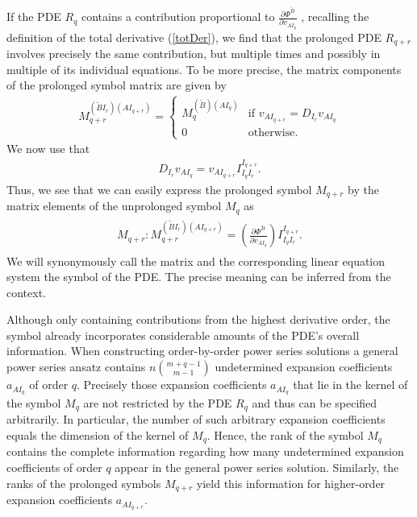 If the PDE $R_q$ contains a contribution proportional to $\frac{\partial \Phi^{\tilde{B}}}{\partial v_{AI_q}}$ , recalling the definition of the total derivative (\ref{totDer}), we find that the prolonged PDE $R_{q+r}$ involves precisely the same contribution, but multiple times and possibly in multiple of its individual equations. 
To be more precise, the matrix components of the prolonged symbol matrix are given by
\begin{align}
M_{q+r}^{(\tilde{B}I_r) (AI_{q+r})} = 
\begin{cases}
M_q^{(\tilde{B}) (AI_q)}  & \text{if \ \ }  
    v_{AI_{q+r}} = D_{I_r} v_{AI_q} \\
0 & \text{otherwise}.
\end{cases}
\end{align} 
We now use that 
\begin{align}
    D_{I_r}v_{AI_q} = v_{AI_{q+r}}I_{I_q I_r}^{I_{q+r}}.
\end{align}
Thus, we see that we can easily express the prolonged symbol $M_{q+r}$ by the matrix elements of the unprolonged symbol $M_q$ as
\begin{align}
    \begin{aligned}
    M_{q+r} : M_{q+r} ^{(\tilde{B}I_r) (AI_{q+r})}  = \left ( \frac{\partial \Phi^{\tilde{B}}}{\partial v_{AI_q}} \right ) I_{I_q I_r}^{I_{q+r}} .
    \end{aligned}
\end{align}
We will synonymously call the matrix and the corresponding linear equation system the symbol of the PDE. The precise meaning can be inferred from the context. 


Although only containing contributions from the highest derivative order, the symbol already incorporates considerable amounts of the PDE's overall information.
When constructing order-by-order power series solutions
a general power series ansatz contains
$n\binom{m+q-1}{m-1}$ undetermined expansion coefficients $a_{AI_q}$ of order $q$. 
Precisely those expansion coefficients $a_{AI_q}$ that lie in the kernel of the symbol $M_q$ are not restricted by the PDE $R_q$ and thus can be specified arbitrarily. In particular, the number of such arbitrary expansion coefficients equals the dimension of the kernel of $M_q$. 
Hence, the rank of the symbol $M_q$ contains the complete information regarding how many undetermined expansion coefficients of order $q$ appear in the general power series solution.
Similarly, the ranks of the prolonged symbols $M_{q+r}$ yield this information for higher-order expansion coefficients $a_{AI_{q+r}}$.

